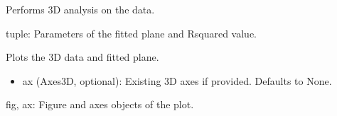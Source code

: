\documentclass[a4paper,10pt,english]{sphinxmanual}
\begin{document}
\begin{fulllineitems}
\begin{fulllineitems}
\end{fulllineitems}


\begin{fulllineitems}
\label{\detokenize{utils:src.utils.plane3D_plot.Plane3DPlotter.perform_analysis}}
\pysigstartsignatures
{}
\pysigstopsignatures
\sphinxAtStartPar
Performs 3D analysis on the data.
\begin{description}
\sphinxAtStartPar
tuple: Parameters of the fitted plane and R\sphinxhyphen{}squared value.

\end{description}

\end{fulllineitems}


\begin{fulllineitems}
\label{\detokenize{utils:src.utils.plane3D_plot.Plane3DPlotter.plot_3D_data}}
\pysigstartsignatures
{}
\pysigstopsignatures
\sphinxAtStartPar
Plots the 3D data and fitted plane.
\begin{description}
\begin{itemize}
\item {} 
\sphinxAtStartPar
ax (Axes3D, optional): Existing 3D axes if provided. Defaults to None.

\end{itemize}

\sphinxAtStartPar
fig, ax: Figure and axes objects of the plot.

\end{description}

\end{fulllineitems}



\end{fulllineitems}
\end{document}

